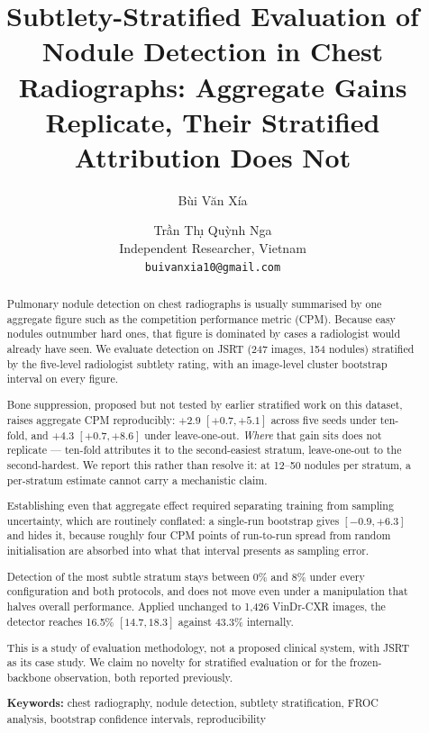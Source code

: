 \documentclass[11pt,a4paper]{article}
\title{\textbf{Subtlety-Stratified Evaluation of Nodule Detection in Chest
Radiographs: Aggregate Gains Replicate, Their Stratified Attribution Does Not}}
\author{B\`ui V\u{a}n X\'ia \and Tr\`{\^a}n Th\d{\i} Qu\`ynh Nga \\[2pt]
\normalsize Independent Researcher, Vietnam \\
\normalsize \texttt{buivanxia10@gmail.com}}
\date{}
\begin{document}
\maketitle

\begin{abstract}
\noindent
Pulmonary nodule detection on chest radiographs is usually summarised by one
aggregate figure such as the competition performance metric (CPM). Because easy
nodules outnumber hard ones, that figure is dominated by cases a radiologist
would already have seen. We evaluate detection on JSRT (247 images, 154 nodules)
stratified by the five-level radiologist subtlety rating, with an image-level
cluster bootstrap interval on every figure.

Bone suppression, proposed but not tested by earlier stratified work on this
dataset, raises aggregate CPM reproducibly: $+2.9$ $[+0.7, +5.1]$ across five
seeds under ten-fold, and $+4.3$ $[+0.7, +8.6]$ under leave-one-out. \emph{Where}
that gain sits does not replicate --- ten-fold attributes it to the
second-easiest stratum, leave-one-out to the second-hardest. We report this
rather than resolve it: at 12--50 nodules per stratum, a per-stratum estimate
cannot carry a mechanistic claim.

Establishing even that aggregate effect required separating training from
sampling uncertainty, which are routinely conflated: a single-run bootstrap gives
$[-0.9, +6.3]$ and hides it, because roughly four CPM points of run-to-run spread
from random initialisation are absorbed into what that interval presents as
sampling error.

Detection of the most subtle stratum stays between 0\% and 8\% under every
configuration and both protocols, and does not move even under a manipulation
that halves overall performance. Applied unchanged to 1{,}426 VinDr-CXR images,
the detector reaches 16.5\% $[14.7, 18.3]$ against 43.3\% internally.

This is a study of evaluation methodology, not a proposed clinical system, with
JSRT as its case study. We claim no novelty for stratified evaluation or for the
frozen-backbone observation, both reported previously.

\medskip
\noindent\textbf{Keywords:} chest radiography, nodule detection, subtlety
stratification, FROC analysis, bootstrap confidence intervals, reproducibility
\end{abstract}

\end{document}
